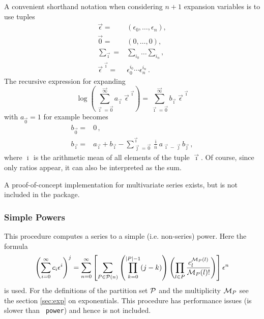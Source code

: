 \documentclass{article}
\begin{document}
A convenient shorthand notation when considering $n+1$ expansion variables is to
use tuples 
\begin{align}
\label{eq:multivar_conv}
\vec{\epsilon}=&(\epsilon_0,\dots,\epsilon_n), \\
\vec{0}=&(0,\dots,0), \\
\sum_{\vec{\imath}}=&\sum_{i_0}\dots\sum_{i_n}, \\
\vec{\epsilon}^{\;\vec{\imath}} =& \epsilon_0^{i_0 }\cdots\epsilon_n^{i_n}\,.
\end{align}
The recursive expression for expanding
\begin{equation}
  \label{eq:log_multivar}
\log\left(\sum_{\vec{\imath}=\vec{0}}^{\vec{\infty}}a_{\vec{\imath}}\;
 \vec{\epsilon}^{\;\vec{\imath}}\right)=\sum_{\vec{\imath}=\vec{0}}^{\vec{\infty}} b_{\vec{\imath}}\;\vec{\epsilon}^{\;\vec{\imath}}
 \end{equation}
with $a_{\vec{0}}=1$ for example becomes
\begin{align}
  \label{eq:rec_log_multivar}
  b_{\vec{0}}=&0\,,\\
b_{\vec{\imath}}=&a_{\vec{\imath}}+b_{\vec{\imath}}-\sum_{\vec{\jmath}=\vec{0}}^{\vec{\imath}}
\frac{\overline{\imath}}{\overline{n}} a_{\vec{\imath}-\vec{\jmath}} b_{\vec{\jmath}}\,,
 \end{align}
where $\overline{\imath}$ is the arithmetic mean of all elements of the tuple
$\vec{\imath}$. Of course, since only ratios appear, it can also be
interpreted as the sum.

A proof-of-concept implementation for multivariate series exists, but is
not included in the package.

\subsubsection{Simple Powers}
\label{sec:impl_simpl_pow}

This procedure computes a series to a simple
(i.e. non-series) power. Here the formula
\begin{equation}
  \label{eq:simpl_pow}
  \left(\sum_{i=0}^{\infty}c_i \epsilon^i\right)^j = \sum_{n=0}^\infty
  \left[\sum_{P \in {\cal P}(n)}\left(\prod_{k=0}^{|P|-1}
    (j-k)\right)\left(\prod_{l \in P} \frac{c^{{\cal M}_P(l)}_l}{{\cal M}_P(l)!} \right)\right]\epsilon^n
\end{equation}
is used. For the definitions of the partition set ${\cal P}$ and the
multiplicity ${\cal M}_P$ see the section \ref{sec:exp} on
exponentials. This procedure has performance issues (is slower than {\tt
  power}) and hence is not included.
\end{document}
